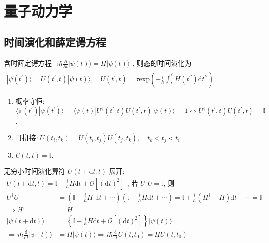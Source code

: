 \documentclass[../../main.tex]{subfiles}
\begin{document}
\section{量子动力学}

\subsection{时间演化和薛定谔方程}
含时薛定谔方程 $\begin{aligned}
    i\hbar\frac{\partial}{\partial t}|\psi(t)\rangle = H|\psi(t)\rangle
\end{aligned}$, 则态的时间演化为 $\begin{aligned}
    |\psi(t^{\prime})\rangle = U(t^{\prime},t)|\psi(t)\rangle,\quad U(t^{\prime},t)=\tau\text{exp}\left(-\frac{i}{\hbar}\int_{t}^{t^{\prime}}H(t^{\prime\prime})\mathrm{d}t^{\prime\prime}\right)
\end{aligned}$
\begin{enumerate}
    \item 概率守恒: $\langle\psi(t^{\prime})|\psi(t^{\prime})\rangle = \langle\psi(t)|U^{\dagger}(t^{\prime},t)U(t^{\prime},t)|\psi(t)\rangle = 1\iff U^{\dagger}(t^{\prime},t)U(t^{\prime},t) = \mathbb{I}$.
    \item 可拼接: $U(t_{i},t_{k}) = U(t_{i},t_{j})U(t_{j},t_{k}),\quad t_{k} < t_{j} < t_{i}$
    \item $U(t,t)=\mathbb{I}$.
\end{enumerate}
无穷小时间演化算符 $U(t+\mathrm{d}t,t)$ 展开: $\begin{aligned}
    U(t+\mathrm{d}t,t) = \mathbb{I} - \frac{i}{\hbar}H\mathrm{d}t + \mathcal{O}[(\mathrm{d}t)^{2}]
\end{aligned}$, 若 $U^{\dagger}U = \mathbb{I}$, 则
\begin{align*}
    U^{\dagger}U &= \left(\mathbb{I} + \frac{i}{\hbar}H^{\dagger}\mathrm{d}t + \cdots\right)\left(\mathbb{I} - \frac{i}{\hbar}H\mathrm{d}t + \cdots\right) = \mathbb{I} + \frac{i}{\hbar}(H^{\dagger} - H)\mathrm{d}t + \cdots = \mathbb{I}\\
    \Rightarrow H^{\dagger} &= H\\
    |\psi(t+\mathrm{d}t)\rangle &= \left\{\mathbb{I} - \frac{i}{\hbar}H\mathrm{d}t + \mathcal{O}[(\mathrm{d}t)^{2}]\right\}|\psi(t)\rangle \\
    \Rightarrow i\hbar\frac{\mathrm{d}}{\mathrm{d}t}|\psi(t)\rangle &= H|\psi(t)\rangle\Rightarrow i\hbar\frac{\mathrm{d}}{\mathrm{d}t}U(t,t_{0}) = HU(t,t_{0})
\end{align*}
\end{document}
